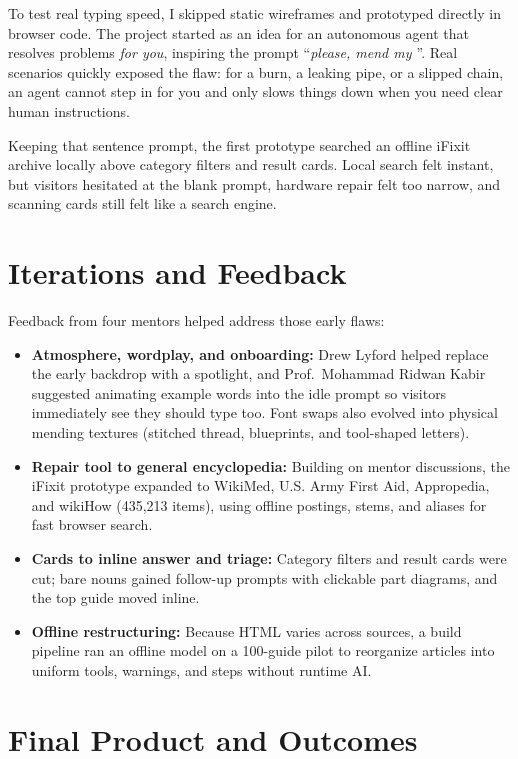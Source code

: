 \documentclass[10pt,letterpaper]{article}
\begin{document}
To test real typing speed, I skipped static wireframes and prototyped directly in browser code. The project started as an idea for an autonomous agent that resolves problems \textit{for you}, inspiring the prompt ``\textit{please, mend my \underline{\hspace{1.4em}}}''. Real scenarios quickly exposed the flaw: for a burn, a leaking pipe, or a slipped chain, an agent cannot step in for you and only slows things down when you need clear human instructions.

Keeping that sentence prompt, the first prototype searched an offline iFixit archive locally above category filters and result cards. Local search felt instant, but visitors hesitated at the blank prompt, hardware repair felt too narrow, and scanning cards still felt like a search engine.

\section{Iterations and Feedback}

Feedback from four mentors helped address those early flaws:
\begin{itemize}
    \item \textbf{Atmosphere, wordplay, and onboarding:} Drew Lyford helped replace the early backdrop with a spotlight, and Prof.\ Mohammad Ridwan Kabir suggested animating example words into the idle prompt so visitors immediately see they should type too. Font swaps also evolved into physical mending textures (stitched thread, blueprints, and tool-shaped letters).
    \item \textbf{Repair tool to general encyclopedia:} Building on mentor discussions, the iFixit prototype expanded to WikiMed, U.S. Army First Aid, Appropedia, and wikiHow (435,213 items), using offline postings, stems, and aliases for fast browser search.
    \item \textbf{Cards to inline answer and triage:} Category filters and result cards were cut; bare nouns gained follow-up prompts with clickable part diagrams, and the top guide moved inline.
    \item \textbf{Offline restructuring:} Because HTML varies across sources, a build pipeline ran an offline model on a 100-guide pilot to reorganize articles into uniform tools, warnings, and steps without runtime AI.
\end{itemize}

\section{Final Product and Outcomes}
\end{document}
